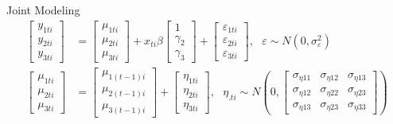 \documentclass[
  ignorenonframetext,
]{beamer}
\begin{document}
\begin{frame}{Joint Modeling}
\protect\hypertarget{joint-modeling}{}
\begin{align*}
\begin{bmatrix}
y_{1ti} \\
y_{2ti} \\
y_{3ti}
\end{bmatrix} &=
\begin{bmatrix}
\mu_{1ti} \\
\mu_{2ti} \\
\mu_{3ti}
\end{bmatrix} +
x_{ti} \beta
\begin{bmatrix}
1 \\
\gamma_2 \\
\gamma_3
\end{bmatrix} +
\begin{bmatrix}
\varepsilon_{1ti} \\
\varepsilon_{2ti} \\
\varepsilon_{3ti}
\end{bmatrix} , \ \ \ \varepsilon \sim N(0, \sigma^2_\varepsilon)\\
\begin{bmatrix}
\mu_{1ti} \\
\mu_{2ti} \\
\mu_{3ti}
\end{bmatrix} &= 
\begin{bmatrix}
\mu_{1(t-1)i} \\
\mu_{2(t-1)i} \\
\mu_{3(t-1)i}
\end{bmatrix} + 
\begin{bmatrix}
\eta_{1ti} \\
\eta_{2ti} \\
\eta_{3ti}
\end{bmatrix}, \ \ \ \eta_{.ti} \sim N(0,
\begin{bmatrix}
\sigma_{\eta11} & \sigma_{\eta12} &  \sigma_{\eta13}\\
\sigma_{\eta12} & \sigma_{\eta22} &  \sigma_{\eta23}   \\
\sigma_{\eta13} & \sigma_{\eta23} &  \sigma_{\eta33}
\end{bmatrix}
)
\end{align*}
\end{frame}
\end{document}
